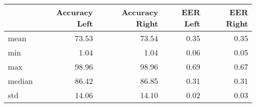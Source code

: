 \begin{tabular}{lrrrr}
\toprule
{} &  Accuracy Left &  Accuracy Right &  EER Left &  EER Right \\
\midrule
mean   &          73.53 &           73.54 &      0.35 &       0.35 \\
min    &           1.04 &            1.04 &      0.06 &       0.05 \\
max    &          98.96 &           98.96 &      0.69 &       0.67 \\
median &          86.42 &           86.85 &      0.31 &       0.31 \\
std    &          14.06 &           14.10 &      0.02 &       0.03 \\
\bottomrule
\end{tabular}
